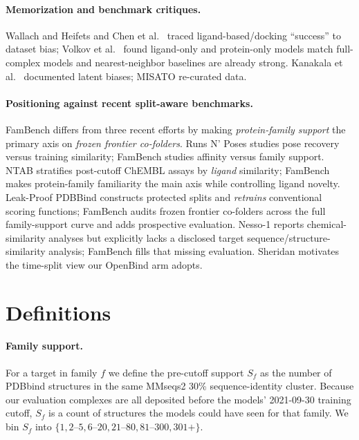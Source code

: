 \documentclass[11pt]{article}
\begin{document}
\paragraph{Memorization and benchmark critiques.} Wallach and Heifets
\citep{wallach2018memorization} and Chen et al.\ \citep{chen2019dude} traced ligand-based/docking
``success'' to dataset bias; Volkov et al.\ \citep{volkov2022frustration} found ligand-only and
protein-only models match full-complex models and nearest-neighbor baselines are already strong.
Kanakala et al.\ \citep{kanakala2023latentbiases} documented latent biases; MISATO
\citep{siebenmorgen2024misato} re-curated data.

\paragraph{Positioning against recent split-aware benchmarks.} FamBench differs from three recent
efforts by making \emph{protein-family support} the primary axis on \emph{frozen frontier
co-folders}. Runs N' Poses \citep{runsnposes2025} studies pose recovery versus training
similarity; FamBench studies affinity versus family support. NTAB \citep{ntab2025} stratifies
post-cutoff ChEMBL assays by \emph{ligand} similarity; FamBench makes protein-family familiarity
the main axis while controlling ligand novelty. Leak-Proof PDBBind \citep{li2023leakproof}
constructs protected splits and \emph{retrains} conventional scoring functions; FamBench audits
frozen frontier co-folders across the full family-support curve and adds prospective evaluation.
Nesso-1 \citep{valencelabs2026nesso1} reports chemical-similarity analyses but explicitly lacks a
disclosed target sequence/structure-similarity analysis; FamBench fills that missing evaluation.
Sheridan \citep{sheridan2013timesplit} motivates the time-split view our OpenBind arm adopts.

\section{Definitions}
\label{sec:gap}

\paragraph{Family support.} For a target in family $f$ we define the pre-cutoff support
$S_f$ as the number of PDBbind structures in the same MMseqs2 \citep{steinegger2017mmseqs2} 30\%
sequence-identity cluster. Because our evaluation complexes are all deposited before the models'
2021-09-30 training cutoff, $S_f$ is a count of structures the models could have seen for that
family. We bin $S_f$ into $\{1, 2\text{--}5, 6\text{--}20, 21\text{--}80, 81\text{--}300, 301+\}$.
\end{document}
